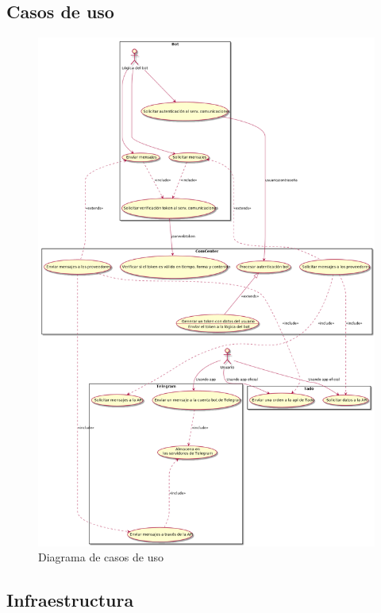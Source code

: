 \documentclass[spanish,12pt, a4paper, twoside]{paper}
\begin{document}
\subsection{Casos de uso}

\begin{figure}
\centering
	\includegraphics[width=\textwidth]{recursos/usecases}
\caption{Diagrama de casos de uso}
\label{fig:Diagrama de casos de uso}
\end{figure}

\subsection{Infraestructura}
\end{document}
